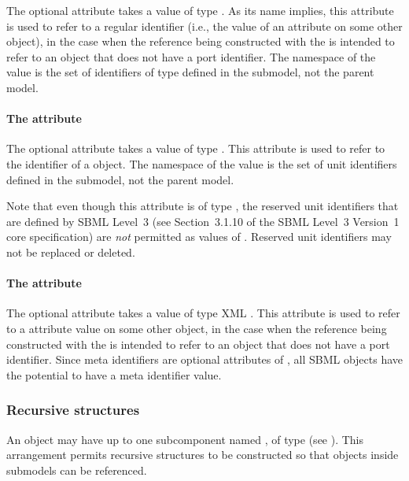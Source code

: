 The optional attribute  takes a value of type
.  As its name implies, this attribute is used to
refer to a regular identifier (i.e., the value of an 
attribute on some other object), in the case when the reference being
constructed with the \SBaseRef is intended to refer to an object that
does not have a port identifier.  The namespace of the 
value is the set of identifiers of type  defined in the
submodel, not the parent model.


\paragraph{The \fixttspace{} attribute}
\label{sbaseref-unitref}

The optional attribute  takes a value of type
.  This attribute is used to refer to the identifier
of a \UnitDefinition object.  The namespace of the 
value is the set of unit identifiers defined in the submodel, not the
parent model.

Note that even though this attribute is of type ,
the reserved unit identifiers that are defined by SBML Level~3 (see
Section~3.1.10 of the SBML Level~3 Version~1 core specification) are
\emph{not} permitted as values of .  Reserved unit
identifiers may not be replaced or deleted.


\paragraph{The \fixttspace{} attribute}
\label{sbaseref-metaidref}

The optional attribute  takes a value of type XML
.  This attribute is used to refer to a 
attribute value on some other object, in the case when the reference
being constructed with the \SBaseRef is intended to refer to an object
that does not have a port identifier.  Since meta identifiers are
optional attributes of \SBase, all SBML objects have the potential to
have a meta identifier value.


\subsubsection{Recursive  structures}
\label{sbaseref-recursive-sbaseref}

An \SBaseRef object may have up to one subcomponent named
, of type \SBaseRef (see ).  This
arrangement permits recursive structures to be constructed so that
objects inside submodels can be referenced.

